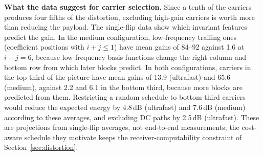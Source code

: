 \textbf{What the data suggest for carrier selection.} Since a tenth of the carriers produces four fifths of the distortion, excluding high-gain carriers is worth more than reducing the payload. The single-flip data show which invariant features predict the gain. In the medium configuration, low-frequency trailing ones (coefficient positions with $i+j\le1$) have mean gains of 84--92 against 1.6 at $i+j=6$, because low-frequency basis functions change the right column and bottom row from which later blocks predict. In both configurations, carriers in the top third of the picture have mean gains of 13.9 (ultrafast) and 65.6 (medium), against 2.2 and 6.1 in the bottom third, because more blocks are predicted from them. Restricting a random schedule to bottom-third carriers would reduce the expected energy by 4.8\,dB (ultrafast) and 7.6\,dB (medium) according to these averages, and excluding DC paths by 2.5\,dB (ultrafast). These are projections from single-flip averages, not end-to-end measurements; the cost-aware schedule they motivate keeps the receiver-computability constraint of Section~\ref{sec:distortion}.
